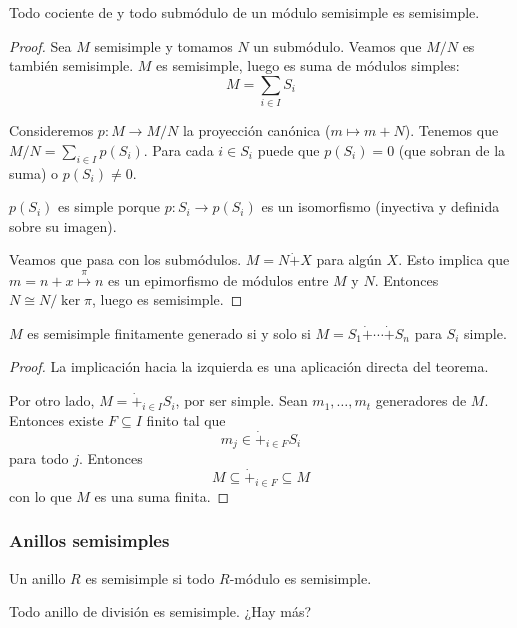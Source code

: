 \begin{cor}
  Todo cociente de y todo submódulo de un módulo semisimple es semisimple.
\end{cor}
\begin{proof}
  Sea \(M\) semisimple y tomamos \(N\) un submódulo. Veamos que \(M/N\) es
  también semisimple. \(M\) es semisimple, luego es suma de módulos simples:
  \[
    M=\sum_{i\in I} S_i
  \]

  Consideremos \(p:M\longrightarrow M/N\) la proyección canónica (\(m\mapsto
  m+N\)). Tenemos que \(M/N=\sum_{i\in I} p(S_i)\). Para cada \(i\in S_i\)
  puede que \(p(S_i)=0\) (que sobran de la suma) o \(p(S_i)\neq 0\).

  \(p(S_i)\) es simple porque \(p:S_i\longrightarrow p(S_i)\) es un
  isomorfismo (inyectiva y definida sobre su imagen).

  Veamos que pasa con los submódulos. \(M=N\dot{+}X\) para algún \(X\).
  Esto implica que \(m=n+x\overset{\pi}{\mapsto} n\) es un epimorfismo de
  módulos entre \(M\) y \(N\).
  Entonces \(N\cong N/\ker\pi\), luego es semisimple.
\end{proof}

\begin{cor}
  \(M\) es semisimple finitamente generado si y solo si \(M=S_1\dot{+}\cdots
  \dot{+} S_n\) para \(S_i\) simple.
\end{cor}
\begin{proof}
  La implicación hacia la izquierda es una aplicación directa del teorema.

  Por otro lado, \(M=\dot{+}_{i\in I} S_i\), por ser simple.
  Sean \(m_1,\ldots, m_t\) generadores de \(M\). Entonces existe \(F\subseteq
  I\) finito tal que
  \[m_j\in \dot{+}_{i\in F} S_i\] para todo \(j\). Entonces
  \[ M\subseteq \dot{+}_{i\in F}\subseteq M\]
  con lo que \(M\) es una suma finita.
\end{proof}

\subsubsection{Anillos semisimples}
\begin{df}
  Un anillo \(R\) es semisimple si todo \(R\)-módulo es semisimple.
\end{df}

\begin{obs}
  Todo anillo de división es semisimple. ¿Hay más?
\end{obs}

